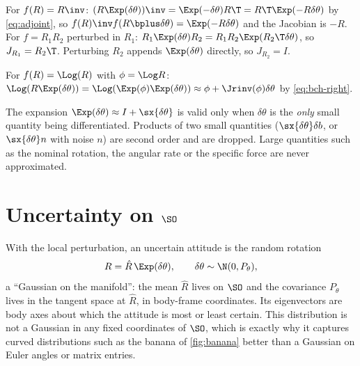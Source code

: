 \begin{example}
For $f(R) = R\inv$: $(R\Exp(\delta\theta))\inv = \Exp(-\delta\theta)R\T = R\T\Exp(-R\delta\theta)$ by
\eqref{eq:adjoint}, so $f(R)\inv f(R\bplus\delta\theta) = \Exp(-R\delta\theta)$ and the Jacobian is $-R$. For
$f = R_1R_2$ perturbed in $R_1$: $R_1\Exp(\delta\theta)R_2 = R_1R_2\Exp(R_2\T\delta\theta)$, so $J_{R_1} = R_2\T$.
Perturbing $R_2$ appends $\Exp(\delta\theta)$ directly, so $J_{R_2} = I$.
\end{example}

\begin{example}[Logarithm]
For $f(R) = \Log(R)$ with $\phi = \Log R$: $\Log(R\Exp(\delta\theta)) = \Log(\Exp(\phi)\Exp(\delta\theta)) \approx
\phi + \Jrinv(\phi)\delta\theta$ by \eqref{eq:bch-right}.
\end{example}

\begin{pitfall}
The expansion $\Exp(\delta\theta) \approx I + \sx{\delta\theta}$ is valid only when $\delta\theta$ is the
\emph{only} small quantity being differentiated. Products of two small quantities ($\sx{\delta\theta}\delta b$,
or $\sx{\delta\theta}n$ with noise $n$) are second order and are dropped. Large quantities such as the
nominal rotation, the angular rate or the specific force are never approximated.
\end{pitfall}

\section{Uncertainty on \texorpdfstring{$\SO$}{SO(3)}}

With the local perturbation, an uncertain attitude is the random rotation
\begin{equation}
  R = \hat R\,\Exp(\delta\theta), \qquad \delta\theta \sim \N(0, P_\theta),
\end{equation}
a ``Gaussian on the manifold'': the mean $\hat R$ lives on $\SO$ and the covariance $P_\theta$ lives in the
tangent space at $\hat R$, in body-frame coordinates. Its eigenvectors are body axes about which the
attitude is most or least certain. This distribution is not a Gaussian in any fixed coordinates of
$\SO$, which is exactly why it captures curved distributions such as the banana of \cref{fig:banana}
better than a Gaussian on Euler angles or matrix entries.


